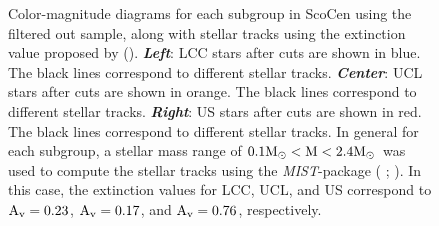 \begin{figure}[!ht]
\centering
\caption{\scriptsize{Color-magnitude diagrams for each subgroup in ScoCen using the filtered out sample, along with stellar tracks using the extinction value proposed by  (\citeyear{1989A&A...216...44D}). \textit{\textbf{Left}}: LCC stars after cuts are shown in blue. The black lines correspond to different stellar tracks. \textit{\textbf{Center}}: UCL stars after cuts are shown in orange. The black lines correspond to different stellar tracks. \textit{\textbf{Right}}: US stars after cuts are shown in red. The black lines correspond to different stellar tracks. In general for each subgroup, a stellar mass range of $0.1 \textnormal{M}_\odot < \textnormal{M} < 2.4 \textnormal{M}_\odot$ was used to compute the stellar tracks using the \textit{MIST}-package ( \citeyear{2016ApJS..222....8D};  \citeyear{2016ApJ...823..102C}). In this case, the extinction values for LCC, UCL, and US correspond to $\textnormal{A}_\textnormal{v} = 0.23$, $\textnormal{A}_\textnormal{v} = 0.17$, and $\textnormal{A}_\textnormal{v} = 0.76$, respectively.}}
\label{fig:DR2_Tracks}
\end{figure}

